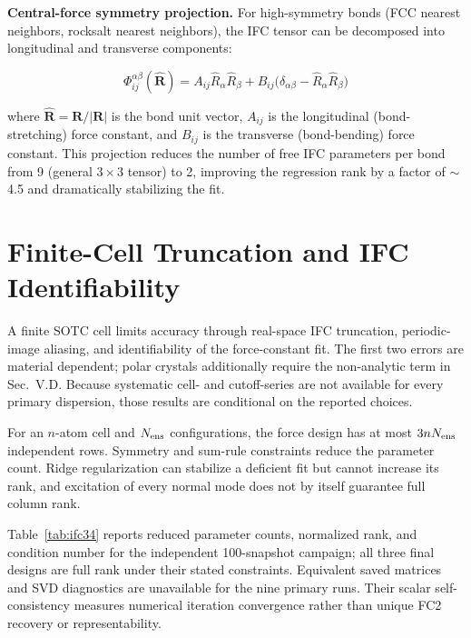 \documentclass[aps,prb,reprint,amsmath,amssymb,floatfix]{revtex4-2}
\begin{document}
\textbf{Central-force symmetry projection.} For high-symmetry bonds (FCC
nearest neighbors, rocksalt nearest neighbors), the IFC tensor can be
decomposed into longitudinal and transverse components:

\begin{equation*}
\Phi_{ij}^{\alpha\beta}(\hat{\mathbf{R}}) = A_{ij}\hat{R}_\alpha\hat{R}_\beta + B_{ij}\bigl(\delta_{\alpha\beta} - \hat{R}_\alpha\hat{R}_\beta\bigr)
\end{equation*}

where \(\hat{\mathbf{R}} = \mathbf{R}/|\mathbf{R}|\) is the bond unit
vector, \(A_{ij}\) is the longitudinal (bond-stretching) force constant,
and \(B_{ij}\) is the transverse (bond-bending) force constant. This
projection reduces the number of free IFC parameters per bond from 9
(general \(3\times3\) tensor) to 2, improving the regression rank by a
factor of $\sim$4.5 and dramatically stabilizing the fit.

\color{revisionblue}
\section{Finite-Cell Truncation and IFC Identifiability}
\label{appendix-e-finite-cell-truncation-and-ifc-identifiability}
\color{black}

\color{revisionblue}
A finite SOTC cell limits accuracy through real-space IFC truncation,
periodic-image aliasing, and identifiability of the force-constant fit. The
first two errors are material dependent; polar crystals additionally require
the non-analytic term in Sec.~V.D. Because systematic cell- and cutoff-series
are not available for every primary dispersion, those results are conditional
on the reported choices.
\color{black}

\color{revisionblue}
For an \(n\)-atom cell and \(N_{\rm ens}\) configurations, the force design has
at most \(3nN_{\rm ens}\) independent rows. Symmetry and sum-rule constraints
reduce the parameter count. Ridge regularization can stabilize a deficient fit
but cannot increase its rank, and excitation of every normal mode does not by
itself guarantee full column rank.
\color{black}

\color{revisionblue}
Table~\ref{tab:ifc34} reports reduced parameter counts, normalized rank, and
condition number for the independent 100-snapshot campaign; all three final
designs are full rank under their stated constraints. Equivalent saved matrices
and SVD diagnostics are unavailable for the nine primary runs. Their scalar
self-consistency measures numerical iteration convergence rather than unique
FC2 recovery or representability.
\color{black}
\end{document}
